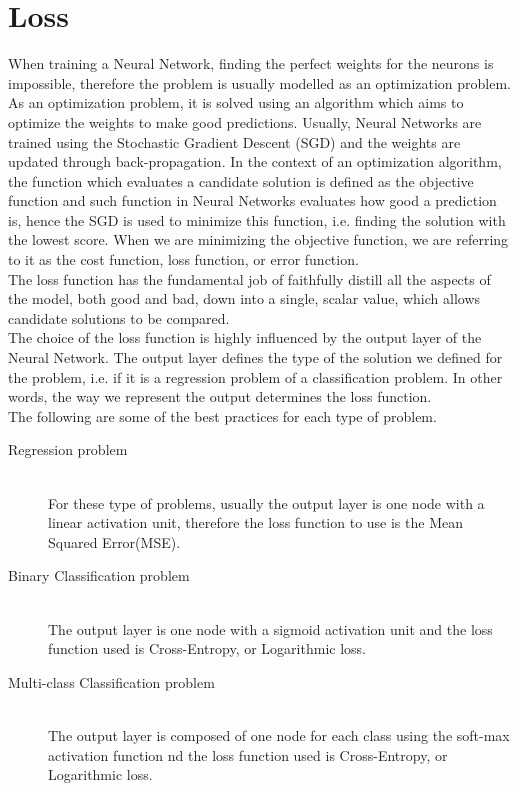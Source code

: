 \section{Loss}
When training a Neural Network, finding the perfect weights for the neurons is impossible, therefore the problem is usually modelled as an optimization problem. As an optimization problem, it is solved using an algorithm which aims to optimize the weights to make good predictions. Usually, Neural Networks are trained using the Stochastic Gradient Descent (SGD) and the weights are updated through back-propagation. In the context of an optimization algorithm, the function which evaluates a candidate solution is defined as the objective function and such function in Neural Networks evaluates how good a prediction is, hence the SGD is used to minimize this function, i.e. finding the solution with the lowest score. 
When we are minimizing the objective function, we are referring to it as the cost function, loss function, or error function.\cite{Goodfellow-et-al-2016}\\
The loss function has the fundamental job of faithfully distill all the aspects of the model, both good and bad, down into a single, scalar value, which allows candidate solutions to be compared. \cite{reed_neural_1999}\\
The choice of the loss function is highly influenced by the output layer of the Neural Network. The output layer defines the type of the solution we defined for the problem, i.e. if it is a regression problem of a classification problem. In other words, the way we  represent the output determines the loss function. \cite{Goodfellow-et-al-2016}\\
The following are some of the best practices for each type of problem. 

\begin{description}
  \item[Regression problem] \hfill\\ 
  For these type of problems, usually the output layer is one node with a linear activation unit, therefore the loss function to use is the Mean Squared Error(MSE). 
  \item[Binary Classification problem] \hfill\\ 
  The output layer is one node with a sigmoid activation unit and the loss function used is Cross-Entropy, or Logarithmic loss. 
  \item[Multi-class Classification problem] \hfill\\ 
  The output layer is composed of one node for each class using the soft-max activation function nd the loss function used is Cross-Entropy, or Logarithmic loss. 
\end{description}


